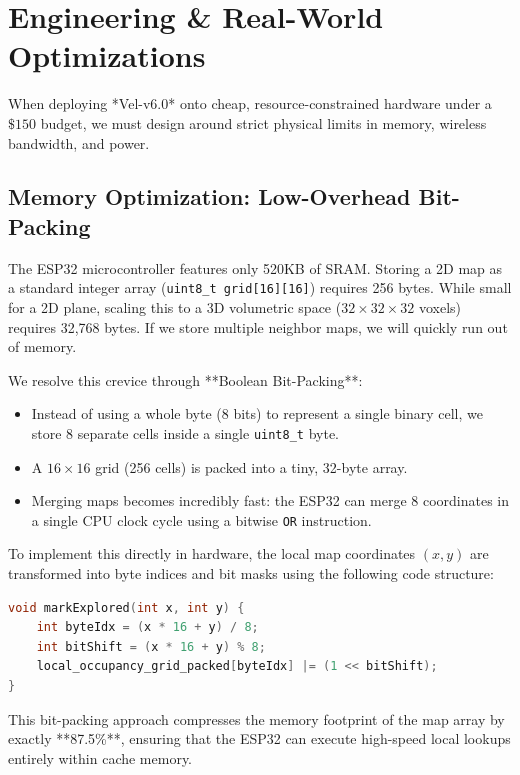 \documentclass[letterpaper, 10pt, conference]{IEEEtran}
\begin{document}
\section{Engineering \& Real-World Optimizations}
\label{sec:engineering}

When deploying *Vel-v6.0* onto cheap, resource-constrained hardware under a $\$150$ budget, we must design around strict physical limits in memory, wireless bandwidth, and power.

\subsection{Memory Optimization: Low-Overhead Bit-Packing}
The ESP32 microcontroller features only 520KB of SRAM. Storing a 2D map as a standard integer array (\texttt{uint8\_t grid[16][16]}) requires 256 bytes. While small for a 2D plane, scaling this to a 3D volumetric space ($32 \times 32 \times 32$ voxels) requires 32,768 bytes. If we store multiple neighbor maps, we will quickly run out of memory.

We resolve this crevice through **Boolean Bit-Packing**:
\begin{itemize}
    \item Instead of using a whole byte (8 bits) to represent a single binary cell, we store 8 separate cells inside a single \texttt{uint8\_t} byte.
    \item A $16 \times 16$ grid (256 cells) is packed into a tiny, 32-byte array.
    \item Merging maps becomes incredibly fast: the ESP32 can merge 8 coordinates in a single CPU clock cycle using a bitwise \texttt{OR} instruction.
\end{itemize}

To implement this directly in hardware, the local map coordinates $(x,y)$ are transformed into byte indices and bit masks using the following code structure:
\begin{lstlisting}[language=C++]
void markExplored(int x, int y) {
    int byteIdx = (x * 16 + y) / 8;
    int bitShift = (x * 16 + y) % 8;
    local_occupancy_grid_packed[byteIdx] |= (1 << bitShift);
}
\end{lstlisting}

This bit-packing approach compresses the memory footprint of the map array by exactly **87.5\%**, ensuring that the ESP32 can execute high-speed local lookups entirely within cache memory.
\end{document}
